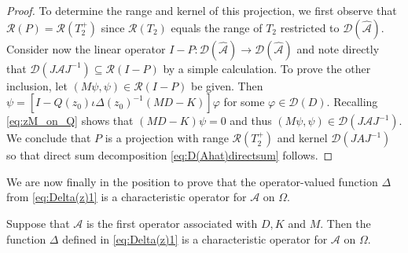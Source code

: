\documentclass[english]{myarticle}
\begin{document}
\begin{sloppypar}
\begin{proof}
To determine the range and kernel of this projection, we first observe that $\mathcal{R}(P) = \mathcal{R}(T_2^+)$ since $\mathcal{R}(T_{2})$ equals the range of $T_2$ restricted to $\mathcal{D}(\hat{\mathcal{A}})$. Consider now the linear operator $I-P : \mathcal{D}(\hat{\mathcal{A}}) \to \mathcal{D}(\hat{\mathcal{A}})$ and note directly that $\mathcal{D}(J\mathcal{A}J^{-1}) \subseteq \mathcal{R}(I-P)$ by a simple calculation. To prove the other inclusion, let $(M\psi,\psi) \in \mathcal{R}(I-P)$ be given. Then $\psi = [I - Q(z_0)\iota \Delta(z_0)^{-1} (MD-K)] \varphi$ for some $\varphi \in \mathcal{D}(D)$. Recalling \eqref{eq:zM_on_Q} shows that $(MD-K)\psi = 0$ and thus $(M \psi,\psi) \in \mathcal{D}(J\mathcal{A}J^{-1})$. We conclude that $P$ is a projection with range $\mathcal{R}(T_2^+)$ and kernel $\mathcal{D}(JAJ^{-1})$ so that direct sum decomposition \eqref{eq:D(Ahat)directsum} follows.
\end{proof}

We are now finally in the position to prove that the operator-valued function $\Delta$ from \eqref{eq:Delta(z)1} is a characteristic operator for $\mathcal{A}$ on $\Omega$.

\begin{theorem} \label{thm:rhoAcharac}
Suppose that $\mathcal{A}$ is the first operator associated with $D,K$ and $M$. Then the function $\Delta$ defined in \eqref{eq:Delta(z)1} is a characteristic operator for $\mathcal{A}$ on $\Omega$.
\end{theorem}


\end{sloppypar}
\end{document}
